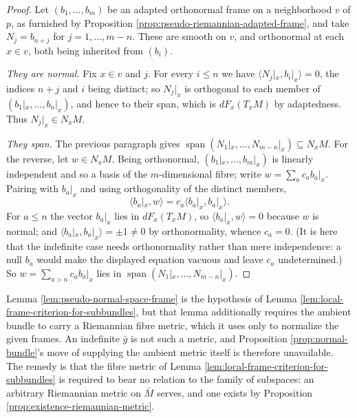 \begin{proof}
\leanok
{}
Let $(b_1,\ldots,b_m)$ be an adapted orthonormal frame on a neighborhood $v$ of $p$, as furnished by Proposition \ref{prop:pseudo-riemannian-adapted-frame}, and take $N_j = b_{n+j}$ for $j = 1,\ldots,m-n$. These are smooth on $v$, and orthonormal at each $x \in v$, both being inherited from $(b_i)$.

\emph{They are normal.} Fix $x \in v$ and $j$. For every $i \leq n$ we have $\langle N_j|_x, b_i|_x \rangle = 0$, the indices $n+j$ and $i$ being distinct; so $N_j|_x$ is orthogonal to each member of $(b_1|_x,\ldots,b_n|_x)$, and hence to their span, which is $dF_x(T_xM)$ by adaptedness. Thus $N_j|_x \in N_xM$.

\emph{They span.} The previous paragraph gives $\operatorname{span}(N_1|_x,\ldots,N_{m-n}|_x) \subseteq N_xM$. For the reverse, let $w \in N_xM$. Being orthonormal, $(b_1|_x,\ldots,b_m|_x)$ is linearly independent and so a basis of the $m$-dimensional fibre; write $w = \sum_a c_a b_a|_x$. Pairing with $b_a|_x$ and using orthogonality of the distinct members,
\[
  \langle b_a|_x, w\rangle = c_a \langle b_a|_x, b_a|_x\rangle .
\]
For $a \leq n$ the vector $b_a|_x$ lies in $dF_x(T_xM)$, so $\langle b_a|_x, w \rangle = 0$ because $w$ is normal; and $\langle b_a|_x,b_a|_x\rangle = \pm 1 \neq 0$ by orthonormality, whence $c_a = 0$. (It is here that the indefinite case needs orthonormality rather than mere independence: a null $b_a$ would make the displayed equation vacuous and leave $c_a$ undetermined.) So $w = \sum_{a > n} c_a b_a|_x$ lies in $\operatorname{span}(N_1|_x,\ldots,N_{m-n}|_x)$.
\end{proof}

Lemma \ref{lem:pseudo-normal-space-frame} is the hypothesis of Lemma \ref{lem:local-frame-criterion-for-subbundles}, but that lemma additionally requires the ambient bundle to carry a Riemannian fibre metric, which it uses only to normalize the given frames. An indefinite $\bar{g}$ is not such a metric, and Proposition \ref{prop:normal-bundle}'s move of supplying the ambient metric itself is therefore unavailable. The remedy is that the fibre metric of Lemma \ref{lem:local-frame-criterion-for-subbundles} is required to bear no relation to the family of subspaces: an arbitrary Riemannian metric on $\bar{M}$ serves, and one exists by Proposition \ref{prop:existence-riemannian-metric}.

